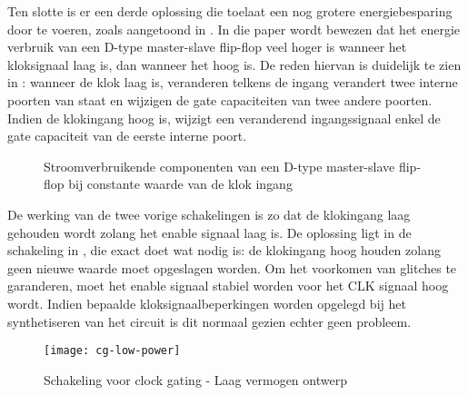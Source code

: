 Ten slotte is er een derde oplossing die toelaat een nog grotere energiebesparing door te voeren, zoals aangetoond in \cite{mueller}. In die paper wordt bewezen dat het energie verbruik van een D-type master-slave flip-flop veel hoger is wanneer het kloksignaal laag is, dan wanneer het hoog is. De reden hiervan is duidelijk te zien in : wanneer de klok laag is, veranderen telkens de ingang verandert twee interne poorten van staat en wijzigen de gate capaciteiten van twee andere poorten. Indien de klokingang hoog is, wijzigt een veranderend ingangssignaal enkel de gate capaciteit van de eerste interne poort.

\begin{figure}[h]
	\centering
		\caption[Stroomverbruikende componenten van een D-type master-slave flip-flop bij constante waarde van de klok ingang]{Stroomverbruikende componenten van een D-type master-slave flip-flop bij constante waarde van de klok ingang \protect\cite{mueller}\label{figuur-implementatie-optimalisatie-cg-power-dis}}
\end{figure}

De werking van de twee vorige schakelingen is zo dat de klokingang laag gehouden wordt zolang het enable signaal laag is. De oplossing ligt in de schakeling in , die exact doet wat nodig is: de klokingang hoog houden zolang geen nieuwe waarde moet opgeslagen worden. Om het voorkomen van glitches te garanderen, moet het enable signaal stabiel worden voor het CLK signaal hoog wordt. Indien bepaalde kloksignaalbeperkingen worden opgelegd bij het synthetiseren van het circuit is dit normaal gezien echter geen probleem.

\begin{figure}[h]
	\centering
		\texttt{[image: cg-low-power]}
		\caption{Schakeling voor clock gating - Laag vermogen ontwerp\label{figuur-implementatie-optimalisatie-cg-low-power}}
\end{figure}
